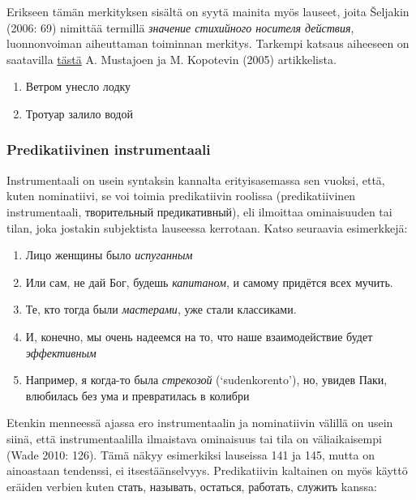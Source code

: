 \documentclass[]{scrartcl}
\providecommand{\tightlist}{%
  \setlength{\itemsep}{0pt}\setlength{\parskip}{0pt}}
\begin{document}
Erikseen tämän merkityksen sisältä on syytä mainita myös lauseet, joita
Šeljakin (2006: 69) nimittää termillä \emph{значение стихийного носителя
действия}, luonnonvoiman aiheuttaman toiminnan merkitys. Tarkempi
katsaus aiheeseen on saatavilla
\href{http://www.helsinki.fi/~mustajok/pdf/Lodku_uneslo_vetrom.pdf}{tästä}
A. Mustajoen ja M. Kopotevin (2005) artikkelista.

\begin{enumerate}
\def\labelenumi{(\arabic{enumi})}
\setcounter{enumi}{138}
\tightlist
\item
  Ветром унесло лодку
\item
  Тротуар залило водой
\end{enumerate}

\subsubsection{Predikatiivinen
instrumentaali}\label{predikatiivinen-instrumentaali}

Instrumentaali on usein syntaksin kannalta erityisasemassa sen vuoksi,
että, kuten nominatiivi, se voi toimia predikatiivin roolissa
(predikatiivinen instrumentaali, творительный предикативный), eli
ilmoittaa ominaisuuden tai tilan, joka jostakin subjektista lauseessa
kerrotaan. Katso seuraavia esimerkkejä:

\begin{enumerate}
\def\labelenumi{(\arabic{enumi})}
\setcounter{enumi}{140}
\tightlist
\item
  Лицо женщины было \emph{испуганным}
\item
  Или сам, не дай Бог, будешь \emph{капитаном}, и самому придётся всех
  мучить.
\item
  Те, кто тогда были \emph{мастерами}, уже стали классиками.
\item
  И, конечно, мы очень надеемся на то, что наше взаимодействие будет
  \emph{эффективным}
\item
  Например, я когда-то была \emph{стрекозой} (`sudenkorento'), но,
  увидев Паки, влюбилась без ума и превратилась в колибри
\end{enumerate}

Etenkin menneessä ajassa ero instrumentaalin ja nominatiivin välillä on
usein siinä, että instrumentaalilla ilmaistava ominaisuus tai tila on
väliaikaisempi (Wade 2010: 126). Tämä näkyy esimerkiksi lauseissa 141 ja
145, mutta on ainoastaan tendenssi, ei itsestäänselvyys. Predikatiivin
kaltainen on myös käyttö eräiden verbien kuten стать, называть,
остаться, работать, служить kanssa:
\end{document}
